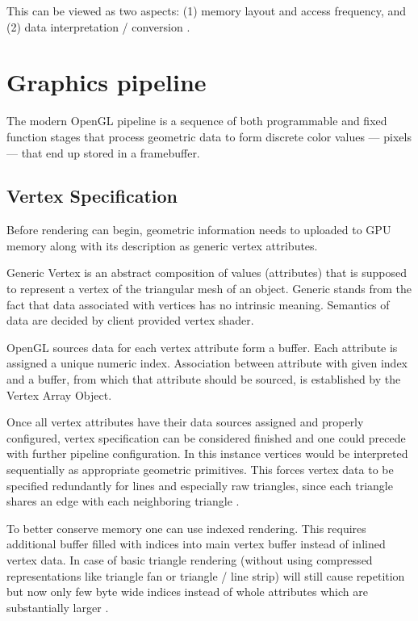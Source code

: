 This can be viewed as two aspects: (1) memory layout and access frequency, and (2) data interpretation / conversion \cite{glwiki}.

\section{Graphics pipeline}
The modern OpenGL pipeline is a sequence of both programmable and fixed function stages that process geometric data to form discrete color values --- pixels --- that end up stored in a framebuffer.

\subsection{Vertex Specification}

Before rendering can begin, geometric information needs to uploaded to GPU memory along with its description as generic vertex attributes.

Generic Vertex is an abstract composition of values (attributes) that is supposed to represent a vertex of the triangular mesh of an object.
Generic stands from the fact that data associated with vertices has no intrinsic meaning.
Semantics of data are decided by client provided vertex shader.

OpenGL sources data for each vertex attribute form a buffer. Each attribute is assigned a unique numeric index.
Association between attribute with given index and a buffer, from which that attribute should be sourced, is established by the Vertex Array Object.

Once all vertex attributes have their data sources assigned and properly configured, vertex specification can be considered finished and one could precede with further pipeline configuration.
In this instance vertices would be interpreted sequentially as appropriate geometric primitives. This forces vertex data to be specified redundantly for 
lines and especially raw triangles, since each triangle shares an edge with each neighboring triangle \cite{openglspec}.

To better conserve memory one can use indexed rendering. This requires additional buffer filled with indices into main vertex buffer instead of inlined vertex data.
In case of basic triangle rendering (without using compressed representations like triangle fan or triangle / line strip) 
will still cause repetition but now only few byte wide indices instead of whole attributes which are substantially larger \cite{openglspec}.


